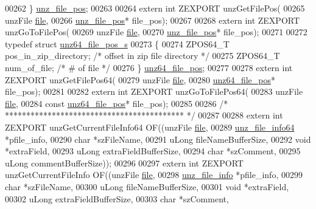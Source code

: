 \begin{DoxyCode}
00262 \} \hyperlink{structunz__file__pos__s}{unz\_file\_pos};
00263 
00264 \textcolor{keyword}{extern} \textcolor{keywordtype}{int} ZEXPORT unzGetFilePos(
00265     unzFile \hyperlink{structfile}{file},
00266     \hyperlink{structunz__file__pos__s}{unz\_file\_pos}* file\_pos);
00267 
00268 \textcolor{keyword}{extern} \textcolor{keywordtype}{int} ZEXPORT unzGoToFilePos(
00269     unzFile \hyperlink{structfile}{file},
00270     \hyperlink{structunz__file__pos__s}{unz\_file\_pos}* file\_pos);
00271 
00272 \textcolor{keyword}{typedef} \textcolor{keyword}{struct }\hyperlink{structunz64__file__pos__s}{unz64\_file\_pos\_s}
00273 \{
00274     ZPOS64\_T pos\_in\_zip\_directory;   \textcolor{comment}{/* offset in zip file directory */}
00275     ZPOS64\_T num\_of\_file;            \textcolor{comment}{/* # of file */}
00276 \} \hyperlink{structunz64__file__pos__s}{unz64\_file\_pos};
00277 
00278 \textcolor{keyword}{extern} \textcolor{keywordtype}{int} ZEXPORT unzGetFilePos64(
00279     unzFile \hyperlink{structfile}{file},
00280     \hyperlink{structunz64__file__pos__s}{unz64\_file\_pos}* file\_pos);
00281 
00282 \textcolor{keyword}{extern} \textcolor{keywordtype}{int} ZEXPORT unzGoToFilePos64(
00283     unzFile \hyperlink{structfile}{file},
00284     \textcolor{keyword}{const} \hyperlink{structunz64__file__pos__s}{unz64\_file\_pos}* file\_pos);
00285 
00286 \textcolor{comment}{/* ****************************************** */}
00287 
00288 \textcolor{keyword}{extern} \textcolor{keywordtype}{int} ZEXPORT unzGetCurrentFileInfo64 OF((unzFile \hyperlink{structfile}{file},
00289                          \hyperlink{structunz__file__info64__s}{unz\_file\_info64} *pfile\_info,
00290                          \textcolor{keywordtype}{char} *szFileName,
00291                          uLong fileNameBufferSize,
00292                          \textcolor{keywordtype}{void} *extraField,
00293                          uLong extraFieldBufferSize,
00294                          \textcolor{keywordtype}{char} *szComment,
00295                          uLong commentBufferSize));
00296 
00297 \textcolor{keyword}{extern} \textcolor{keywordtype}{int} ZEXPORT unzGetCurrentFileInfo OF((unzFile \hyperlink{structfile}{file},
00298                          \hyperlink{structunz__file__info__s}{unz\_file\_info} *pfile\_info,
00299                          \textcolor{keywordtype}{char} *szFileName,
00300                          uLong fileNameBufferSize,
00301                          \textcolor{keywordtype}{void} *extraField,
00302                          uLong extraFieldBufferSize,
00303                          \textcolor{keywordtype}{char} *szComment,

\end{DoxyCode}

